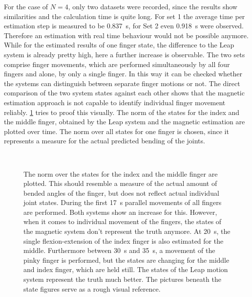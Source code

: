 For the case of $ N = 4 $, only two datasets were recorded, since the results show similarities and the calculation time is quite long. For set 1 the average time per estimation step is measured to be \SI{0.837}{\second}, for Set 2 even \SI{0.918}{\second} were observed. Therefore an estimation with real time behaviour would not be possible anymore. While for the estimated results of one finger state, the difference to the Leap system is already pretty high, here a further increase is observable. The two sets comprise finger movements, which are performed simultaneously by all four fingers and alone, by only a single finger. In this way it can be checked whether the systems can distinguish between separate finger motions or not. The direct comparison of the two system states against each other shows that the magnetic estimation approach is not capable to identify individual finger movement reliably. \ref{fig:est44} tries to proof this visually. The norm of the states for the index and the middle finger, obtained by the Leap system and the magnetic estimation are plotted over time. The norm over all states for one finger is chosen, since it represents a measure for the actual predicted bending of the joints. 
\begin{figure}[!htb]
\centering
{}\\
\caption[Estimating the motion of four fingers]
{The norm over the states for the index and the middle finger are plotted. This should resemble a measure of the actual amount of bended angles of the finger, but does not reflect actual individual joint states. During the first \SI{17}{\second} parallel movements of all fingers are performed. Both systems show an increase for this. However, when it comes to individual movement of the fingers, the states of the magnetic system don't represent the truth anymore. At \SI{20}{\second}, the single flexion-extension of the index finger is also estimated for the middle. Furthermore between \SI{30}{\second} and \SI{35}{\second}, a movement of the pinky finger is performed, but the states are changing for the middle and index finger, which are held still. The states of the Leap motion system represent the truth much better. The pictures beneath the state figures serve as a rough visual reference.}
\label{fig:est44}
\end{figure}
